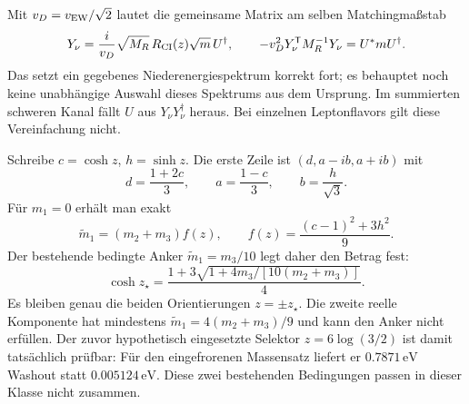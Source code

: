 Mit $v_D=v_{\rm EW}/\sqrt2$ lautet die gemeinsame Matrix am selben Matchingmaßstab
\begin{equation}
Y_\nu=\frac{i}{v_D}\sqrt{M_R}\,R_{\rm CI}(z)\sqrt{m}\,U^\dagger,
\qquad
-v_D^2Y_\nu^{\mathsf T}M_R^{-1}Y_\nu=U^*mU^\dagger.
\end{equation}
Das setzt ein gegebenes Niederenergiespektrum korrekt fort; es behauptet noch keine unabhängige Auswahl dieses Spektrums aus dem Ursprung. Im summierten schweren Kanal fällt $U$ aus $Y_\nu Y_\nu^\dagger$ heraus. Bei einzelnen Leptonflavors gilt diese Vereinfachung nicht.

Schreibe $c=\cosh z$, $h=\sinh z$. Die erste Zeile ist $(d,a-ib,a+ib)$ mit
\begin{equation}
d=\frac{1+2c}{3},\qquad a=\frac{1-c}{3},\qquad b=\frac{h}{\sqrt3}.
\end{equation}
Für $m_1=0$ erhält man exakt
\begin{equation}
\widetilde m_1=(m_2+m_3)f(z),\qquad
f(z)=\frac{(c-1)^2+3h^2}{9}.
\end{equation}
Der bestehende bedingte Anker $\widetilde m_1=m_3/10$ legt daher den Betrag fest:
\begin{equation}\label{eq:nuactualselection}
\boxed{\cosh z_\star=
\frac{1+3\sqrt{1+4m_3/[10(m_2+m_3)]}}4.}
\end{equation}
Es bleiben genau die beiden Orientierungen $z=\pm z_\star$. Die zweite reelle Komponente hat mindestens $\widetilde m_1=4(m_2+m_3)/9$ und kann den Anker nicht erfüllen. Der zuvor hypothetisch eingesetzte Selektor $z=6\log(3/2)$ ist damit tatsächlich prüfbar: Für den eingefrorenen Massensatz liefert er $0.7871\,\mathrm{eV}$ Washout statt $0.005124\,\mathrm{eV}$. Diese zwei bestehenden Bedingungen passen in dieser Klasse nicht zusammen.

